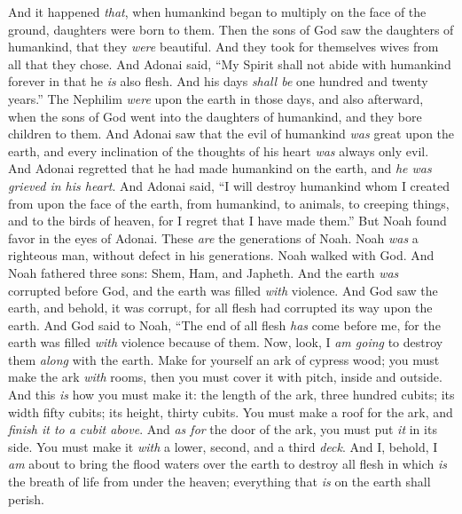 \begin{biblechapter} %
 And it happened \textit{that}, when humankind began to multiply on the face of the ground, daughters were born to them.
\verse Then the sons of God saw the daughters of humankind, that they \textit{were} beautiful. And they took for themselves wives from all that they chose.
\verse And Adonai said, “My Spirit shall not abide with humankind forever in that he \textit{is} also flesh. And his days \textit{shall be} one hundred and twenty years.”
\verse The Nephilim \textit{were} upon the earth in those days, and also afterward, when the sons of God went into the daughters of humankind, and they bore children to them.
\verse And Adonai saw that the evil of humankind \textit{was} great upon the earth, and every inclination of the thoughts of his heart \textit{was} always only evil.
\verse And Adonai regretted that he had made humankind on the earth, and \textit{he was grieved in his heart}.
\verse And Adonai said, “I will destroy humankind whom I created from upon the face of the earth, from humankind, to animals, to creeping things, and to the birds of heaven, for I regret that I have made them.”
\verse But Noah found favor in the eyes of Adonai.
\verse These \textit{are} the generations of Noah. Noah \textit{was} a righteous man, without defect in his generations. Noah walked with God.
\verse And Noah fathered three sons: Shem, Ham, and Japheth.
\verse And the earth \textit{was} corrupted before God, and the earth was filled \textit{with} violence.
\verse And God saw the earth, and behold, it was corrupt, for all flesh had corrupted its way upon the earth.
\verse And God said to Noah, “The end of all flesh \textit{has} come before me, for the earth was filled \textit{with} violence because of them. Now, look, I \textit{am going} to destroy them \textit{along} with the earth.
\verse Make for yourself an ark of cypress wood; you must make the ark \textit{with} rooms, then you must cover it with pitch, inside and outside.
\verse And this \textit{is} how you must make it: the length of the ark, three hundred cubits; its width fifty cubits; its height, thirty cubits.
\verse You must make a roof for the ark, and \textit{finish it to a cubit above}. And \textit{as for} the door of the ark, you must put \textit{it} in its side. You must make it \textit{with} a lower, second, and a third \textit{deck}.
\verse And I, behold, I \textit{am} about to bring the flood waters over the earth to destroy all flesh in which \textit{is} the breath of life from under the heaven; everything that \textit{is} on the earth shall perish.

\end{biblechapter}
